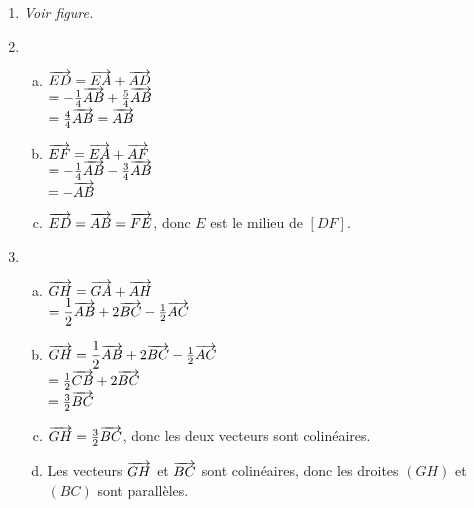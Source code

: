 \documentclass[12pt]{article}
\begin{document}
\begin{exercice}
\begin{multicols}{2}
  \begin{enumerate}[(1)]
      \item \emph{Voir figure.}
      \item
      \begin{enumerate}[(a)]
        \item $\overrightarrow{ED}=\overrightarrow{EA}+\overrightarrow{AD}$\\
          $=-\frac{1}{4}\overrightarrow{AB}+\frac{5}{4}\overrightarrow{AB}$\\
          $=\frac{4}{4}\overrightarrow{AB}=\overrightarrow{AB}$
        \item $\overrightarrow{EF}=\overrightarrow{EA}+\overrightarrow{AF}$\\
          $=-\frac{1}{4}\overrightarrow{AB}-\frac{3}{4}\overrightarrow{AB}$\\
          $=-\overrightarrow{AB}$
        \item $\overrightarrow{ED}=\overrightarrow{AB}=\overrightarrow{FE}$, donc $E$ est le milieu de $[DF]$.
      \end{enumerate}
      \item
      \begin{enumerate}[(a)]
        \item $\overrightarrow{GH}=\overrightarrow{GA}+\overrightarrow{AH}$\\
          $=\dfrac{1}{2}\overrightarrow{AB}+2\overrightarrow{BC}-\frac{1}{2}\overrightarrow{AC}$
        \item $\overrightarrow{GH}=\dfrac{1}{2}\overrightarrow{AB}+2\overrightarrow{BC}-\frac{1}{2}\overrightarrow{AC}$\\
          $=\frac{1}{2}\overrightarrow{CB}+2\overrightarrow{BC}$\\
          $=\frac{3}{2}\overrightarrow{BC}$
        \item $\overrightarrow{GH}=\frac{3}{2}\overrightarrow{BC}$, donc les deux vecteurs sont colinéaires.
        \item Les vecteurs $\overrightarrow{GH}$ et $\overrightarrow{BC}$ sont colinéaires, donc les droites $(GH)$ et $(BC)$ sont parallèles.
      \end{enumerate}
  \end{enumerate}
\end{multicols}
\end{exercice}
\end{document}
